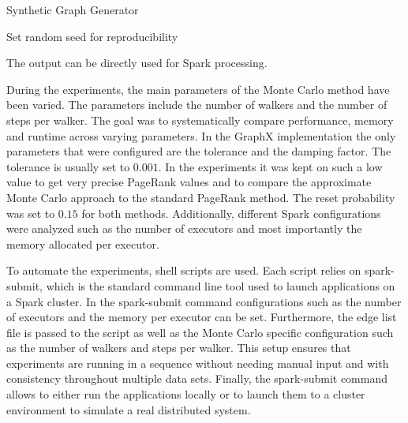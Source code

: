 \begin{algorithm}[H]
\caption{Synthetic Graph Generator}

Set random seed for reproducibility\;
\end{algorithm} 

The output can be directly used for Spark processing.\par
During the experiments, the main parameters of the Monte Carlo method have been varied. The parameters include the number of walkers and the number of steps per walker. The goal was to systematically compare performance, memory and runtime across varying parameters. In the GraphX implementation the only parameters that were configured are the tolerance and the damping factor. The tolerance is usually set to $0.001$. In the experiments it was kept on such a low value to get very precise PageRank values and to compare the approximate Monte Carlo approach to the standard PageRank method. The reset probability was set to $0.15$ for both methods. Additionally, different Spark configurations were analyzed such as the number of executors and most importantly the memory allocated per executor. \par



To automate the experiments, shell scripts are used. Each script relies on spark-submit, which is the standard command line tool used to launch applications on a Spark cluster. In the spark-submit command configurations such as the number of executors and the memory per executor can be set. Furthermore, the edge list file is passed to the script as well as the Monte Carlo specific configuration such as the number of walkers and steps per walker. This setup ensures that experiments are running in a sequence without needing manual input and with consistency throughout multiple data sets. Finally, the spark-submit command allows to either run the applications locally or to launch them to a cluster environment to simulate a real distributed system. \par

